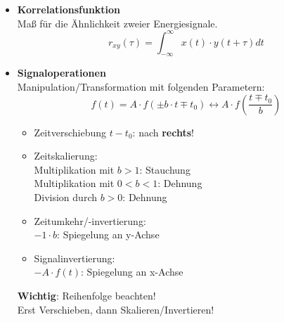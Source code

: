 \begin{itemize}
      \item{\textbf{Korrelationsfunktion}}\\
          {\small Ma{\ss} f\"ur die \"Ahnlichkeit
          zweier Energiesignale.}
              \[
                  r_{xy}(\tau) = \int_{-\infty}^{\infty}x(t)\cdot y(t+\tau) dt
              \]
      \item{\textbf{Signaloperationen}}\\
        {\small Manipulation/Transformation mit folgenden Parametern:}
            \[ \boxed{
				f(t) = A \cdot f(\pm b \cdot t \mp t_0) \leftrightarrow A \cdot f\left(\frac{t\mp t_0}{b}\right)
				}
			\]
		 \renewcommand{\labelitemii}{$\bullet$}
          \begin{itemize}
              \item{Zeitverschiebung $t-t_0$: nach \textbf{rechts}}!

              \item{Zeitskalierung:\\
              	Multiplikation mit $b>1$: Stauchung \\
              	Multiplikation mit $0<b<1$: Dehnung \\
              	Division durch $b>0$: Dehnung}

              \item{Zeitumkehr/-invertierung:\\ $-1 \cdot b$: Spiegelung an y-Achse}
              \item{Signalinvertierung:\\
              $-A\cdot f(t)$: Spiegelung an x-Achse}
              
          \end{itemize}
          \textbf{Wichtig}: Reihenfolge beachten!\\
          Erst Verschieben, dann Skalieren/Invertieren!
  \end{itemize}
